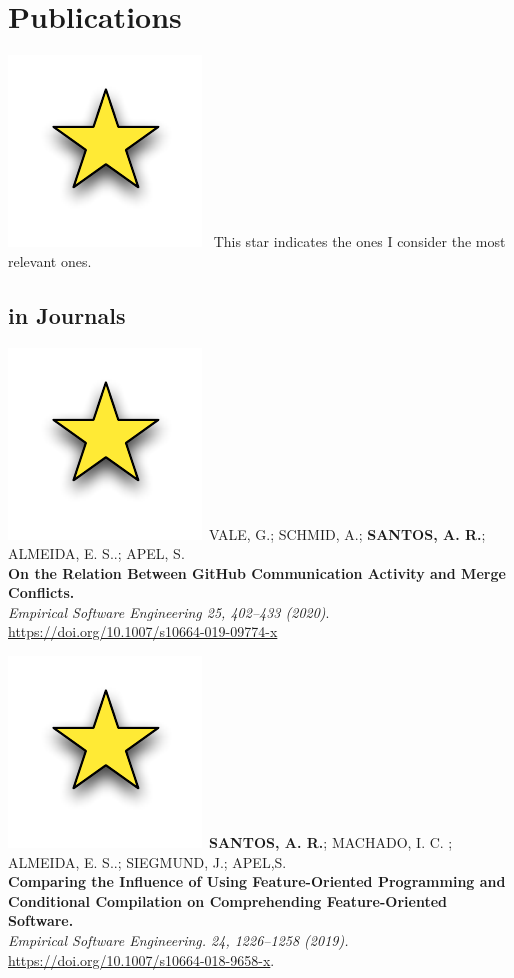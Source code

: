 \documentclass[nocolors]{friggeri-cv-a4}
\begin{document}
\section{Publications}
\includegraphics[scale=.15]{img/star.pdf}~ This star indicates the ones I consider the most relevant ones.
 
\subsection{in Journals}
\includegraphics[scale=.15]{img/star.pdf}~VALE, G.; SCHMID, A.; \textbf{SANTOS, A. R.};  ALMEIDA, E. S..; APEL, S.\\
\textbf{On the Relation Between GitHub Communication Activity and Merge Conflicts.} \\
\emph{Empirical Software Engineering 25, 402–433 (2020)}.\\ \url{https://doi.org/10.1007/s10664-019-09774-x}

\includegraphics[scale=.15]{img/star.pdf}~\textbf{SANTOS, A. R.}; MACHADO, I. C. ; ALMEIDA, E. S..; SIEGMUND, J.; APEL,S.\\
\textbf{Comparing the Influence of Using Feature-Oriented Programming and Conditional Compilation on Comprehending Feature-Oriented Software.} \\
\emph{Empirical Software Engineering. 24, 1226–1258 (2019).}\\ \url{https://doi.org/10.1007/s10664-018-9658-x}.
\end{document}
